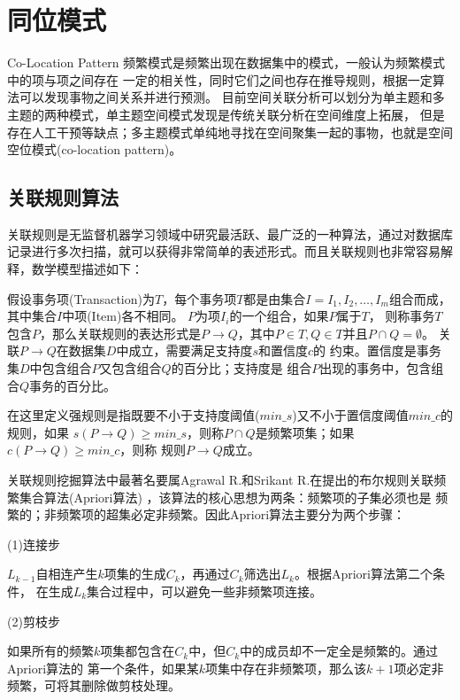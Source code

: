 \section{同位模式}{Co-Location Pattern}
频繁模式是频繁出现在数据集中的模式\cite{Agrawal1995Mining}，一般认为频繁模式中的项与项之间存在
一定的相关性，同时它们之间也存在推导规则，根据一定算法可以发现事物之间关系并进行预测\cite{Agrawal1999Automatic}。
目前空间关联分析可以划分为单主题和多主题的两种模式，单主题空间模式发现是传统关联分析在空间维度上拓展，
但是存在人工干预等缺点；多主题模式单纯地寻找在空间聚集一起的事物，也就是空间空位模式(co-location pattern)。

\subsection{关联规则算法}
关联规则是无监督机器学习领域中研究最活跃、最广泛的一种算法\cite{王佐成2006空间关联规则的双向挖掘}，通过对数据库
记录进行多次扫描，就可以获得非常简单的表述形式。而且关联规则也非常容易解释，数学模型描述如下：

假设事务项(Transaction)为$T$，每个事务项$T$都是由集合$I={I_1,I_2,\ldots,I_m}$组合而成，其中集合$I$中项(Item)各不相同。
$P$为项$I_i$的一个组合，如果$P$属于$T$，
则称事务$T$包含$P$，那么关联规则的表达形式是$P \rightarrow Q$，其中$P\in T, Q\in T$并且$P \cap Q=\emptyset$。
关联$P \rightarrow Q$在数据集$D$中成立，需要满足支持度$s$和置信度$c$的
约束\cite{陈江平2004空间关联规则挖掘算法研究}。置信度是事务集$D$中包含组合$P$又包含组合$Q$的百分比；支持度是
组合$P$出现的事务中，包含组合$Q$事务的百分比\cite{蔡伟杰2001关联规则挖掘综述}。

在这里定义强规则是指既要不小于支持度阈值($min\_s$)又不小于置信度阈值$min\_c$的规则，如果 
$s(P\rightarrow Q) \ge min\_s$，则称$P\cap Q$是频繁项集；如果$c(P\rightarrow Q) \ge min\_c$，则称
规则$P\rightarrow Q$成立。

关联规则挖掘算法中最著名要属Agrawal R.和Srikant R.在提出的布尔规则关联频繁集合算法(Apriori算法)
\cite{Koperski1995Discovery}，该算法的核心思想为两条：频繁项的子集必须也是
频繁的；非频繁项的超集必定非频繁。因此Apriori算法主要分为两个步骤：

(1)连接步

$L_{k-1}$自相连产生$k$项集的生成$C_k$，再通过$C_k$筛选出$L_k$。根据Apriori算法第二个条件，
在生成$L_k$集合过程中，可以避免一些非频繁项连接。

(2)剪枝步

如果所有的频繁$k$项集都包含在$C_k$中，但$C_k$中的成员却不一定全是频繁的。通过Apriori算法的
第一个条件，如果某$k$项集中存在非频繁项，那么该$k+1$项必定非频繁，可将其删除做剪枝处理。

